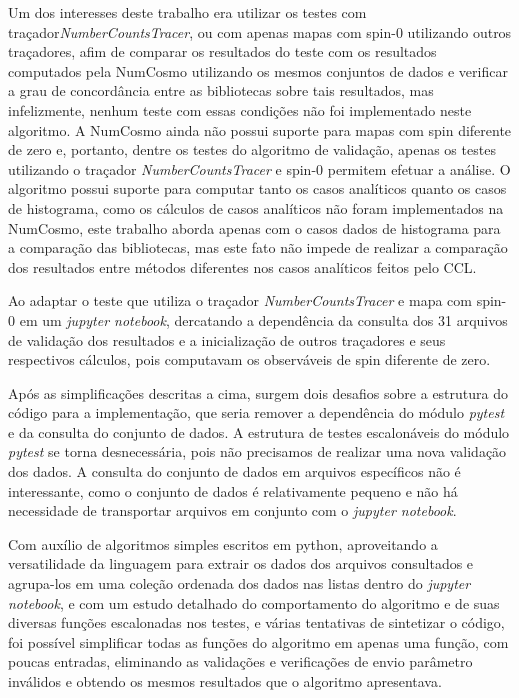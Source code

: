Um dos interesses deste trabalho era utilizar os testes com traçador\textit{NumberCountsTracer}, ou com apenas mapas com spin-0 utilizando outros traçadores, afim de comparar os resultados do teste com os resultados computados pela NumCosmo utilizando os mesmos conjuntos de dados e verificar a grau de concordância entre as bibliotecas sobre tais resultados, mas infelizmente, nenhum teste com essas condições não foi implementado neste algoritmo. A NumCosmo ainda não possui suporte para mapas com spin diferente de zero e, portanto, dentre os testes do algoritmo de validação, apenas os testes utilizando o traçador  \textit{NumberCountsTracer} e spin-0 permitem efetuar a análise. O algoritmo possui suporte para computar tanto os casos analíticos quanto os casos de histograma, como os cálculos de casos analíticos não foram implementados na NumCosmo, este trabalho aborda apenas com o casos dados de histograma para a comparação das bibliotecas, mas este fato não impede de realizar a comparação dos resultados entre métodos diferentes nos casos analíticos feitos pelo CCL.

Ao adaptar o teste que utiliza o traçador \textit{NumberCountsTracer} e mapa com spin-0 em um \textit{jupyter notebook}, dercatando a dependência da consulta dos 31 arquivos de validação dos resultados e a inicialização de outros traçadores e seus respectivos cálculos, pois computavam os observáveis de spin diferente de zero.
 
Após as simplificações descritas a cima, surgem dois desafios sobre a estrutura do código para a implementação, que seria remover a dependência do módulo \textit{pytest} e da consulta do conjunto de dados. A estrutura de testes escalonáveis do módulo \textit{pytest} se torna desnecessária, pois não precisamos de realizar uma nova validação dos dados. A consulta do conjunto de dados em arquivos específicos não é interessante, como o conjunto de dados é relativamente pequeno e não há necessidade de transportar arquivos em conjunto com o \textit{jupyter notebook}.

Com auxílio de algoritmos simples escritos em python, aproveitando a versatilidade da linguagem para extrair os dados dos arquivos consultados e agrupa-los em uma coleção ordenada dos dados nas listas dentro do \textit{jupyter notebook}, e com um estudo detalhado do comportamento do algoritmo e de suas diversas funções escalonadas nos testes, e várias tentativas de sintetizar o código, foi possível simplificar todas as funções do algoritmo em apenas uma função, com poucas entradas, eliminando as validações e verificações de envio parâmetro inválidos e obtendo os mesmos resultados que o algoritmo apresentava.









 













